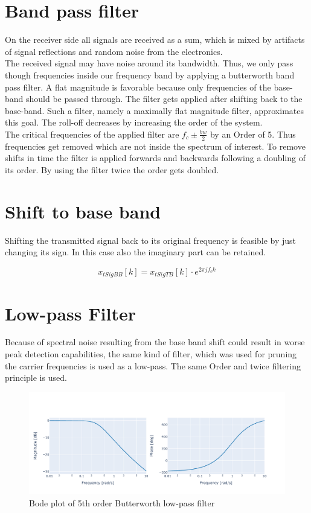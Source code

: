 \section{Band pass filter}
On the receiver side all signals are received as a sum, which is mixed by artifacts of signal reflections and random noise from the electronics.\\
The received signal may have noise around its bandwidth. Thus, we only pass though frequencies inside our frequency band by applying a butterworth band pass filter.
A flat magnitude is favorable because only frequencies of the base-band should be passed through. 
The filter gets applied after shifting back to the base-band. Such a filter, namely a maximally flat magnitude filter, approximates this goal. The roll-off decreases by increasing the order of the system.\\
The critical frequencies of the applied filter are $f_c\pm\frac{bw}{2}$ by an Order of 5. Thus frequencies get removed which are not inside the spectrum of interest. To remove shifts in time the filter is applied forwards and backwards following a doubling of its order. By using the filter twice the order gets doubled.

\section{Shift to base band}

Shifting the transmitted signal back to its original frequency is feasible by just changing its sign. In this case also the imaginary part can be retained.

\begin{equation}
	x_{tSigBB}[k]=x_{tSigTB}[k]\cdot e^{2\pi j f_c k}
	\label{eq:rshift}
\end{equation}

\section{Low-pass Filter}
Because of spectral noise resulting from the base band shift could result in worse peak detection capabilities, the same kind of filter, which was used for pruning the carrier frequencies is used as a low-pass. The same Order and twice filtering principle is used.
\begin{figure}[h]
	\includegraphics[width=\linewidth]{images/bode}
	
	\caption{Bode plot of 5th order Butterworth low-pass filter}
	\label{fig:bode}
\end{figure}

